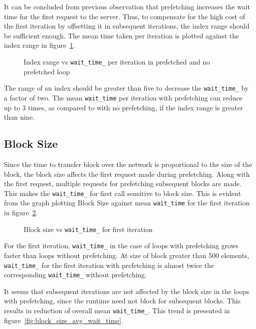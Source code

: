 It can be concluded from previous observation that prefetching increases the wait time
for the first request to the server. Thus, to compensate for the high cost of the first
iteration by offsetting it in subsequent iterations, the index range
should be sufficient enough. The mean time taken per iteration is plotted against
the index range in figure~\ref{fig:p_np_mean}.

\begin{figure}[h]
  
  \caption{Index range vs \texttt{wait\_time\_} per iteration in prefetched and no prefetched loop}
  \label{fig:p_np_mean}
\end{figure}

The range of an index should be greater than five to decrease the \texttt{wait\_time\_}
by a factor of two. The mean \texttt{wait\_time} per iteration with prefetching can
reduce up to 3 times, as compared to with no prefetching, if the index
range is greater than nine.

\subsection{Block Size}
Since the time to transfer block over the network is proportional to the size of the block, the
block size affects the first request made during prefetching. Along with the first
request, multiple requests for prefetching subsequent blocks are made. This makes
the \texttt{wait\_time\_} for first call sensitive to block size. This is evident
from the graph plotting Block Size against mean \texttt{wait\_time} for the first
iteration in figure~\ref{fig:first_wait_time}.
\begin{figure}[h]
  
  \caption{Block size vs \texttt{wait\_time\_} for first iteration}
  \label{fig:first_wait_time}
\end{figure}

For the first iteration, \texttt{wait\_time\_} in the case of loops with prefetching
grows faster than loops without prefetching. At size of block
greater than 500 elements, \texttt{wait\_time\_} for the first iteration with prefetching
is almost twice the corresponding \texttt{wait\_time\_} without prefetching.

It seems that subsequent iterations are not affected by the block size in the loops
with prefetching, since the runtime need not block for subsequent blocks. This results in reduction
of overall mean \texttt{wait\_time\_}. This trend is presented in figure~\ref{fig:block_size_avg_wait_time}.

